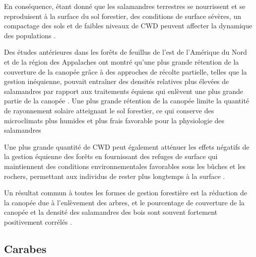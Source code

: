 En conséquence, étant donné que les salamandres terrestres se nourrissent et se reproduisent à la surface du sol forestier, des conditions de surface sévères, 
un compactage des sols et de faibles niveaux de CWD peuvent affecter la dynamique des populations \citep{Peterman2014Spatialvariation}. 

Des études antérieures dans les forêts de feuillus de l'est de l'Amérique du Nord et de la région des Appalaches ont montré qu'une plus grande rétention de la couverture de la canopée grâce à des approches de 
récolte partielle, telles que la gestion inéquienne, pouvait entraîner des densités relatives plus élevées de salamandres par rapport aux traitements équiens qui enlèvent une plus grande partie de la canopée \citep{Hocking2013Effectsexperimental,Harper2015Impactforestry,Mahoney2016Woodlandsalamander}. 
Une plus grande rétention de la canopée limite la quantité de rayonnement solaire atteignant le sol forestier, ce qui conserve des microclimats plus humides et plus frais favorable pour la physiologie des salamandres \citep{Homyack2011Energeticssurfaceactive}

Une plus grande quantité de CWD peut également atténuer les effets négatifs de la gestion équienne des forêts en fournissant des refuges de surface qui maintiennent des conditions environnementales favorables 
sous les bûches et les rochers, permettant aux individus de rester plus longtemps à la surface \citep{Grover1998Influencecover,Moseley2009Locallandscape}. 

Un résultat commun à toutes les formes de gestion forestière est la réduction de la canopée due à l'enlèvement des arbres, et le pourcentage de couverture de la canopée et 
la densité des salamandres des bois sont souvent fortement positivement corrélés \citep{Tilghman2012Metaanalysiseffects}.



\subsection*{Carabes}

